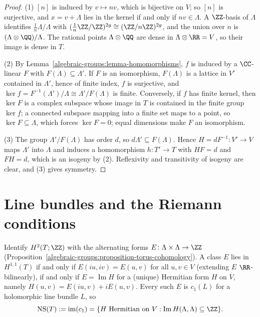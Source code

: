 \begin{proof}
(1) $[n]$ is induced by $v \mapsto nv$, which is bijective on $V$; so $[n]$ is surjective, and $x = v + \Lambda$ lies in the kernel if and only if $nv \in \Lambda$. A $\ZZ$-basis of $\Lambda$ identifies
$\frac1n\Lambda/\Lambda$ with $(\frac1n\ZZ/\ZZ)^{2g} \cong (\ZZ/n\ZZ)^{2g}$, and the union over $n$ is $(\Lambda \otimes \QQ)/\Lambda$. The rational points $\Lambda \otimes \QQ$ are dense in $\Lambda \otimes \RR = V$, so
their image is dense in $T$.

(2) By Lemma~\ref{algebraic-groups:lemma-homomorphisms}, $f$ is induced by a $\CC$-linear $F$ with $F(\Lambda) \subseteq \Lambda'$. If $F$ is an isomorphism, $F(\Lambda)$ is a lattice in $V'$ contained in $\Lambda'$, hence of
finite index, $f$ is surjective, and $\ker f = F^{-1}(\Lambda')/\Lambda \cong \Lambda'/F(\Lambda)$ is finite. Conversely, if $f$ has finite kernel, then $\ker F$ is a complex subspace whose image in $T$ is contained in the
finite group $\ker f$; a connected subspace mapping into a finite set maps to a point, so $\ker F \subseteq \Lambda$, which forces $\ker F = 0$; equal dimensions make $F$ an isomorphism.

(3) The group $\Lambda'/F(\Lambda)$ has order $d$, so $d\Lambda' \subseteq F(\Lambda)$. Hence $H = dF^{-1} \colon V' \to V$ maps $\Lambda'$ into $\Lambda$ and induces a homomorphism $h \colon T' \to T$ with
$HF = d$ and $FH = d$, which is an isogeny by (2). Reflexivity and transitivity of isogeny are clear, and (3) gives symmetry.
\end{proof}

\section{Line bundles and the Riemann conditions}\label{algebraic-groups:section-riemann}

\begin{proposition}\label{algebraic-groups:proposition-neron-severi}
Identify $H^2(T; \ZZ)$ with the alternating forms $E \colon \Lambda \times \Lambda \to \ZZ$ (Proposition~\ref{algebraic-groups:proposition-torus-cohomology}). A class $E$ lies in
$H^{1,1}(T)$ if and only if $E(iu, iv) = E(u, v)$ for all $u, v \in V$ (extending $E$ $\RR$-bilinearly), if and only if $E = \operatorname{Im}H$ for a (unique) Hermitian form $H$ on $V$,
namely $H(u, v) = E(iu, v) + iE(u, v)$. Every such $E$ is $c_1(L)$ for a holomorphic line bundle $L$, so
\[
\mathrm{NS}(T) := \operatorname{im}(c_1) = \{H \text{ Hermitian on } V : \operatorname{Im}H(\Lambda, \Lambda) \subseteq \ZZ\}.
\]
\end{proposition}

